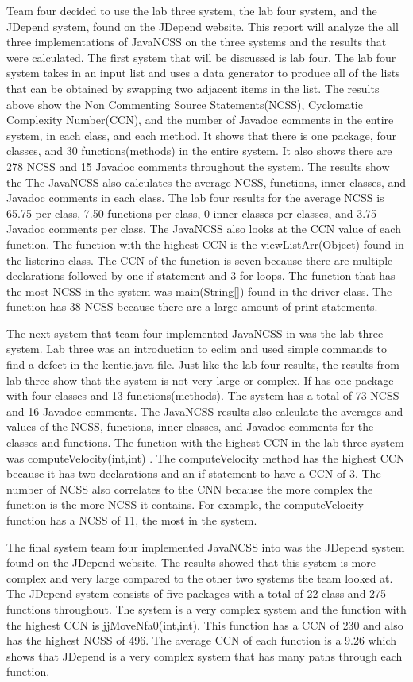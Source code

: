 \documentclass[12pt]{article}
\begin{document}
Team four decided to use the lab three system, the lab four system, and the JDepend system, found on the JDepend website. This report will analyze the all three implementations of JavaNCSS on the three systems and the results that were calculated. The first system that will be discussed is lab four. The lab four system takes in an input list and uses a data generator to produce all of the lists that can be obtained by swapping two adjacent items in the list. The results above show the Non Commenting Source Statements(NCSS), Cyclomatic Complexity Number(CCN), and the number of Javadoc comments in the entire system, in each class, and each method. It shows that there is one package, four classes, and 30 functions(methods) in the entire system. It also shows there are 278 NCSS and 15 Javadoc comments throughout the system. The results show the The JavaNCSS also calculates the average NCSS, functions, inner classes, and Javadoc comments in each class. The lab four results for the average NCSS is 65.75 per class, 7.50 functions per class, 0 inner classes per classes, and 3.75 Javadoc comments per class. The JavaNCSS also looks at the CCN value of each function. The function with the highest CCN is the viewListArr(Object) found in the listerino class. The CCN of the function is seven because there are multiple declarations followed by one if statement and 3 for loops. The function that has the most NCSS in the system was main(String[]) found in the driver class. The function has 38 NCSS because there are a large amount of print statements.

The next system that team four implemented JavaNCSS in was the lab three system. Lab three was an introduction to eclim and used simple commands to find a defect in the kentic.java file. Just like the lab four results, the results from lab three show that the system is not very large or complex. If has one package with four classes and 13 functions(methods). The system has a total of 73 NCSS and 16 Javadoc comments. The JavaNCSS results also calculate the averages and values of the NCSS, functions, inner classes, and Javadoc comments for the classes and functions.  The function with the highest CCN in the lab three system was computeVelocity(int,int) . The computeVelocity method has the highest CCN because it has two declarations and an if statement to have a CCN of 3. The number of NCSS also correlates to the CNN because the more complex the function is the more NCSS it contains. For example, the computeVelocity function has a NCSS of 11, the most in the system.

The final system team four implemented JavaNCSS into was the JDepend system found on the JDepend website. The results showed that this system is more complex and very large compared to the other two systems the team looked at. The JDepend system consists of five packages with a total of 22 class and 275 functions throughout. The system is a very complex system and the function with the highest CCN is jjMoveNfa0(int,int). This function has a CCN of 230 and also has the highest NCSS of 496. The average CCN of each function is a 9.26 which shows that JDepend is a very complex system that has many paths through each function. 



\end{document}
